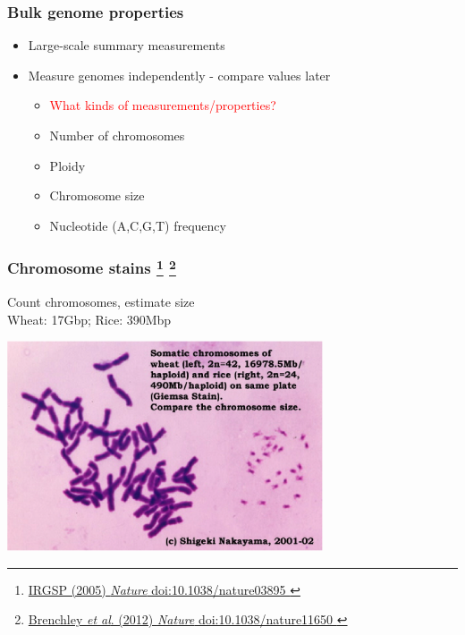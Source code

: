 %
\begin{frame}
  \frametitle{Bulk genome properties}
    \begin{itemize}
      \item Large-scale summary measurements
      \item Measure genomes independently - compare values later
        \begin{itemize}
         \item<2-2> \textcolor{red}{What kinds of measurements/properties?}
         \item<3-> \textcolor{hutton_green}{Number of chromosomes}
         \item<3-> \textcolor{hutton_blue}{Ploidy}
         \item<3-> \textcolor{RawSienna}{Chromosome size}
         \item<3-> \textcolor{hutton_purple}{Nucleotide (A,C,G,T) frequency}        
        \end{itemize}
    \end{itemize}
\end{frame}

%
\begin{frame}
  \frametitle{Chromosome stains
  \footnote{\tiny{\href{http://dx.doi.org/10.1038/nature03895
}{IRGSP (2005) \textit{Nature} doi:10.1038/nature03895
}}}
  \footnote{\tiny{\href{http://dx.doi.org/10.1038/nature11650
}{Brenchley \textit{et al}. (2012) \textit{Nature} doi:10.1038/nature11650
}}}
  }
  Count chromosomes, estimate size \\
  \textcolor{hutton_blue}{Wheat: 17Gbp; Rice: 390Mbp}
  \begin{center}
    \includegraphics[width=0.7\textwidth]{images/wheat_rice_chromosomes}
  \end{center}  
\end{frame}


